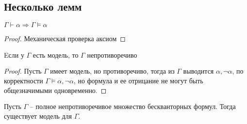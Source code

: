 \subsection{Несколько лемм}
\label{sec-8-4}
\begin{lemma}
$\Gamma \vdash \alpha \Rightarrow \Gamma \models \alpha$
\end{lemma}
\begin{proof}
Механическая проверка аксиом
\end{proof}
\begin{lemma}
Eсли у $\Gamma$ есть модель, то $\Gamma$ непротиворечиво
\end{lemma}
\begin{proof}
Пусть $\Gamma$ имеет модель, но противоречиво, тогда из $\Gamma$ выводится $\alpha, \neg \alpha$, по корректности $\Gamma \models \alpha, \neg \alpha$, но формула и ее отрицание не могут быть общезначимыми одновременно.
\end{proof}
\begin{lemma}
Пусть $\Gamma$ -- полное непротиворечивое множество бескванторных формул. Тогда существует модель для $\Gamma$.
\end{lemma}
